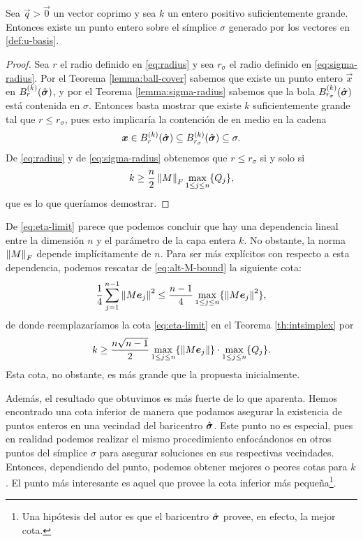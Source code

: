 \begin{theorem}
	\label{th:intsimplex}
	Sea $\vec{q} > \vec{0}$ un vector coprimo y sea $k$ un entero positivo suficientemente grande.
	Entonces existe un punto entero sobre el símplice $\sigma$ generado por los vectores en
	\eqref{def:u-basis}.
\end{theorem}
\begin{proof}
	Sea $r$ el radio definido en \eqref{eq:radius} y sea $r_\sigma$ el radio definido en
	\eqref{eq:sigma-radius}. Por el Teorema \ref{lemma:ball-cover} sabemos que existe un punto
	entero $\vec{x}$ en $B_r^{(k)}(\hat{\boldsymbol{ \sigma }})$, y por el Teorema \ref{lemma:sigma-radius} sabemos
	que la bola $B_{r_\sigma}^{(k)}(\hat{\boldsymbol{ \sigma }})$ está contenida en $\sigma$. Entonces basta
	mostrar que existe $k$ suficientemente grande tal que $r \leq r_\sigma$, pues esto implicaría la
	contención de en medio en la cadena
	\begin{equation*}
		\boldsymbol{x} \in B_r^{(k)}(\hat{\boldsymbol{ \sigma }}) \subseteq B_{r_\sigma}^{(k)}(\hat{\boldsymbol{ \sigma }}) \subseteq \sigma.
	\end{equation*}
	De \eqref{eq:radius} y de \eqref{eq:sigma-radius} obtenemos que $r \leq r_\sigma$ si y solo si
	\begin{equation}
		\label{eq:eta-limit}
		k \geq \frac{n}{2}\left\lVert M \right\rVert_F\max_{1 \leq j \leq n} \lbrace Q_j \rbrace,
	\end{equation}
	que es lo que queríamos demostrar.
\end{proof}
De \eqref{eq:eta-limit} parece que podemos concluir que hay una dependencia lineal entre la
dimensión $n$ y el parámetro de la capa entera $k$. No obstante, la norma $\left\lVert M \right\rVert_F$ depende
implícitamente de $n$. Para ser más explícitos con respecto a esta dependencia, podemos rescatar de
\eqref{eq:alt-M-bound} la siguiente cota:
\begin{equation*}
	\frac{1}{4}\sum_{j=1}^{n-1}\left\lVert M\boldsymbol{e}_j \right\rVert^2
	\leq
	\frac{n-1}{4}\max_{1 \leq j \leq n} \lbrace \left\lVert M\boldsymbol{e}_j \right\rVert^2 \rbrace,
\end{equation*}
de donde reemplazaríamos la cota \eqref{eq:eta-limit} en el Teorema \ref{th:intsimplex} por
\begin{equation*}
	k \geq \frac{n\sqrt{n-1}}{2} \max_{1 \leq j \leq n} \lbrace \left\lVert M\boldsymbol{e}_j \right\rVert \rbrace \cdot
	\max_{1 \leq j \leq n} \lbrace Q_j \rbrace.
\end{equation*}
Esta cota, no obstante, es más grande que la propuesta inicialmente.

Además, el resultado que obtuvimos es más fuerte de lo que aparenta. Hemos encontrado una
cota inferior de manera que podamos asegurar la existencia de puntos enteros en una vecindad del
baricentro $\hat{\boldsymbol{ \sigma }}$. Este punto no es especial, pues en realidad podemos realizar el mismo
procedimiento enfocándonos en otros puntos del símplice $\sigma$ para asegurar soluciones en sus
respectivas vecindades. Entonces, dependiendo del punto, podemos obtener mejores o peores cotas para
$k$. El punto más interesante es aquel que provee la cota inferior más pequeña\footnote{
	Una hipótesis del autor es que el baricentro $\hat{\boldsymbol{ \sigma }}$ provee, en efecto, la mejor cota.
}.

